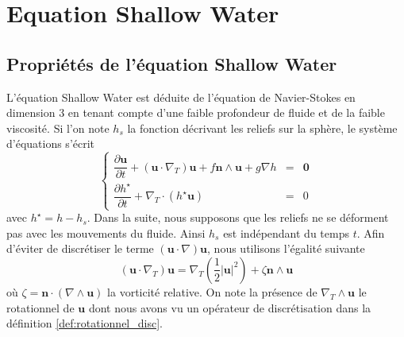 \section{Equation Shallow Water}

\subsection{Propriétés de l'équation Shallow Water}

L'équation Shallow Water est déduite de l'équation de Navier-Stokes en dimension 3 en tenant compte d'une faible profondeur de fluide et de la faible viscosité. Si l'on note $h_s$ la fonction décrivant les reliefs sur la sphère, le système d'équations s'écrit
\begin{equation}
\label{eq:SWEC_new}
\left\lbrace
\begin{array}{rcl}
\dfrac{\partial \mathbf{u}}{\partial t} + \left( \mathbf{u} \cdot \nabla_T \right) \mathbf{u} + f \mathbf{n} \wedge \mathbf{u} + g \nabla h & = & \mathbf{0} \\
\dfrac{\partial h^{\star}}{\partial t} + \nabla_T \cdot \left( h^{\star} \mathbf{u} \right) & = & 0
\end{array}
\right.
\end{equation}
avec $h^{\star} = h - h_s$. Dans la suite, nous supposons que les reliefs ne se déforment pas avec les mouvements du fluide. Ainsi $h_s$ est indépendant du temps $t$.
Afin d'éviter de discrétiser le terme $\left( \mathbf{u} \cdot \nabla \right) \mathbf{u}$, nous utilisons l'égalité suivante 
\begin{equation}
\left( \mathbf{u} \cdot \nabla_T \right) \mathbf{u} = \nabla_T \left( \dfrac{1}{2} |\mathbf{u}|^2 \right) + \zeta \mathbf{n} \wedge \mathbf{u}
\end{equation}
où $\zeta = \mathbf{n} \cdot \left( \nabla \wedge \mathbf{u} \right)$ la vorticité relative. On note la présence de $\nabla_T \wedge \mathbf{u}$ le rotationnel de $\mathbf{u}$ dont nous avons vu un opérateur de discrétisation dans la définition \ref{def:rotationnel_disc}.

